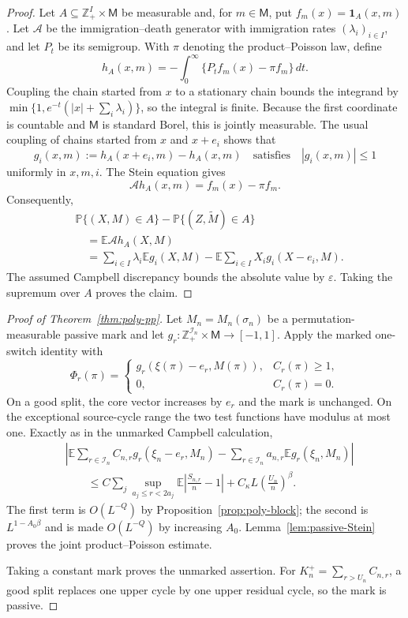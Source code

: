\documentclass[11pt]{article}
\theoremstyle{remark}
\newcommand{\Pp}{\mathbb P}
\newcommand{\Ee}{\mathbb E}
\newcommand{\one}{\mathbf 1}
\newcommand{\dd}{\,d}
\begin{document}
\begin{proof}
Let $A\subseteq\mathbb Z_+^I\times\mathsf M$ be measurable and, for
$m\in\mathsf M$, put $f_m(x)=\one_A(x,m)$.  Let $\mathcal A$ be the
immigration--death generator with immigration rates $(\lambda_i)_{i\in I}$,
and let $P_t$ be its semigroup.  With $\pi$ denoting the product--Poisson
law, define
\[
 h_A(x,m)=-\int_0^\infty\{P_tf_m(x)-\pi f_m\}\dd t.
\]
Coupling the chain started from $x$ to a stationary chain bounds the
integrand by
$\min\{1,e^{-t}(|x|+\sum_i\lambda_i)\}$, so the integral is finite.
Because the first coordinate is countable and $\mathsf M$ is standard
Borel, this is jointly measurable.  The usual coupling of chains started
from $x$ and $x+e_i$ shows that
\[
 g_i(x,m):=h_A(x+e_i,m)-h_A(x,m)
 \quad\text{satisfies}\quad |g_i(x,m)|\le1
\]
uniformly in $x,m,i$.  The Stein equation gives
\[
 \mathcal A h_A(x,m)=f_m(x)-\pi f_m.
\]
Consequently,
\begin{align*}
 &\Pp\{(X,M)\in A\}
 -\Pp\{(Z,\widetilde M)\in A\}\\
 &\quad=\Ee\mathcal A h_A(X,M)\\
 &\quad=\sum_{i\in I}\lambda_i\Ee g_i(X,M)
 -\Ee\sum_{i\in I}X_i g_i(X-e_i,M).
\end{align*}
The assumed Campbell discrepancy bounds the absolute value by
$\varepsilon$.  Taking the supremum over $A$ proves the claim.
\end{proof}

\begin{proof}[Proof of Theorem~\ref{thm:poly-pp}]
Let $M_n=M_n(\sigma_n)$ be a permutation-measurable passive mark and let
$g_r:\mathbb Z_+^{\mathcal I_n}\times\mathsf M\to[-1,1]$.  Apply the marked
one-switch identity with
\[
 \Phi_r(\pi)=
 \begin{cases}
 g_r(\xi(\pi)-e_r,M(\pi)),&C_r(\pi)\ge1,\\
 0,&C_r(\pi)=0.
 \end{cases}
\]
On a good split, the core vector increases by $e_r$ and the mark is
unchanged.  On the exceptional source-cycle range the two test functions
have modulus at most one.  Exactly as in the unmarked Campbell calculation,
\begin{align*}
 &\left|
 \Ee\sum_{r\in\mathcal I_n}C_{n,r}g_r(\xi_n-e_r,M_n)
 -\sum_{r\in\mathcal I_n}a_{n,r}\Ee g_r(\xi_n,M_n)
 \right|\\
 &\qquad\le
 C\sum_j\sup_{a_j\le r<2a_j}
 \Ee\left|\frac{S_{n,r}}n-1\right|
 +C_\kappa L\left(\frac{U_n}{n}\right)^\beta.
\end{align*}
The first term is $O(L^{-Q})$ by
Proposition~\ref{prop:poly-block}; the second is $L^{1-A_0\beta}$ and is
made $O(L^{-Q})$ by increasing $A_0$.  Lemma~\ref{lem:passive-Stein} proves
the joint product--Poisson estimate.

Taking a constant mark proves the unmarked assertion.  For
$K_n^+=\sum_{r>U_n}C_{n,r}$, a good split replaces one upper cycle by one
upper residual cycle, so the mark is passive.
\end{proof}
\end{document}
